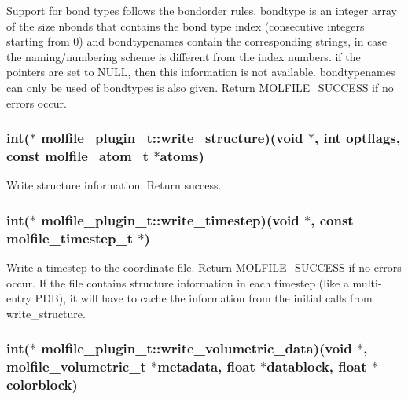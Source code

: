 \-Support for bond types follows the bondorder rules. bondtype is an integer array of the size nbonds that contains the bond type index (consecutive integers starting from 0) and bondtypenames contain the corresponding strings, in case the naming/numbering scheme is different from the index numbers. if the pointers are set to \-N\-U\-L\-L, then this information is not available. bondtypenames can only be used of bondtypes is also given. \-Return \-M\-O\-L\-F\-I\-L\-E\-\_\-\-S\-U\-C\-C\-E\-S\-S if no errors occur. \hypertarget{structmolfile__plugin__t_a96caabc2f33c5a710e82cfe20316568f}{
\subsubsection[{write\-\_\-structure}]{\setlength{\rightskip}{0pt plus 5cm}int($\ast$  {\bf molfile\-\_\-plugin\-\_\-t\-::write\-\_\-structure})({\bf void} $\ast$, int optflags, const {\bf molfile\-\_\-atom\-\_\-t} $\ast$atoms)}}\label{structmolfile__plugin__t_a96caabc2f33c5a710e82cfe20316568f}
\-Write structure information. \-Return success. \hypertarget{structmolfile__plugin__t_acf10fad00927486a1ce859852658e7b0}{
\subsubsection[{write\-\_\-timestep}]{\setlength{\rightskip}{0pt plus 5cm}int($\ast$  {\bf molfile\-\_\-plugin\-\_\-t\-::write\-\_\-timestep})({\bf void} $\ast$, const {\bf molfile\-\_\-timestep\-\_\-t} $\ast$)}}\label{structmolfile__plugin__t_acf10fad00927486a1ce859852658e7b0}
\-Write a timestep to the coordinate file. \-Return \-M\-O\-L\-F\-I\-L\-E\-\_\-\-S\-U\-C\-C\-E\-S\-S if no errors occur. \-If the file contains structure information in each timestep (like a multi-\/entry \-P\-D\-B), it will have to cache the information from the initial calls from write\-\_\-structure. \hypertarget{structmolfile__plugin__t_a46cdd765aa39c041ab2e3ab824d8be5d}{
\subsubsection[{write\-\_\-volumetric\-\_\-data}]{\setlength{\rightskip}{0pt plus 5cm}int($\ast$  {\bf molfile\-\_\-plugin\-\_\-t\-::write\-\_\-volumetric\-\_\-data})({\bf void} $\ast$, {\bf molfile\-\_\-volumetric\-\_\-t} $\ast$metadata, float $\ast$datablock, float $\ast$colorblock)}}\label{structmolfile__plugin__t_a46cdd765aa39c041ab2e3ab824d8be5d}

